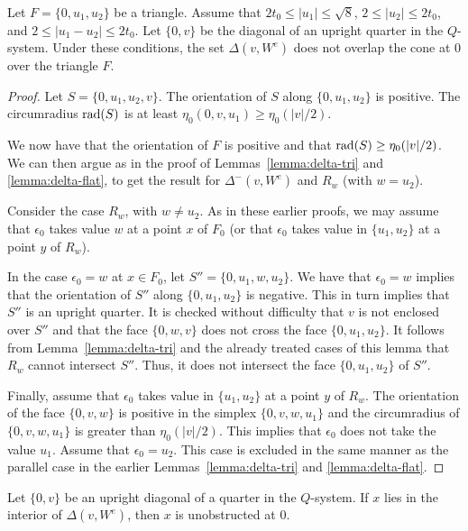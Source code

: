 \begin{lemma}\label{lemma:delta-upright}
Let $F=\{0,u_1,u_2\}$ be a triangle.  Assume that $2t_0\le|u_1|\le
\sqrt8$, $2\le|u_2|\le 2t_0$, and $2\le|u_1-u_2|\le2t_0$.  Let
$\{0,v\}$ be the diagonal of an upright quarter in the $Q$-system.
Under these conditions, the set $\Delta(v,W^e)$ does not overlap
the cone at $0$ over the triangle $F$.
\end{lemma}

\begin{proof}
Let $S=\{0,u_1,u_2,v\}$.  The orientation of $S$ along
$\{0,u_1,u_2\}$ is positive.  The circumradius $\operatorname{rad}(S)$ is at
least $\eta_0(0,v,u_1)\ge\eta_0(|v|/2)$.

We now have that the orientation of $F$ is positive and that
$\operatorname{rad}(S) \ge\eta_0(|v|/2)$.  We can then argue as in the proof of
Lemmas~\ref{lemma:delta-tri} and \ref{lemma:delta-flat}, to get
the result for $\Delta^-(v,W^e)$ and $R_{w}$ (with $w=u_2$).

Consider the case $R_w$, with $w\ne u_2$.  As in these earlier
proofs, we may assume  that $\epsilon_0$ takes value $w$ at a
point $x$ of $F_0$ (or that $\epsilon_0$ takes value in
$\{u_1,u_2\}$ at a point $y$ of $R_w$).

In the case $\epsilon_0=w$ at $x\in F_0$, let
$S''=\{0,u_1,w,u_2\}$. We have that $\epsilon_0=w$ implies that
the orientation of $S''$ along $\{0,u_1,u_2\}$ is negative.  This
in turn implies that $S''$ is an upright quarter.  It is checked
without difficulty that $v$ is not enclosed over $S''$ and that
the face $\{0,w,v\}$ does not cross the face $\{0,u_1,u_2\}$.  It
follows from Lemma~\ref{lemma:delta-tri} and the already treated
cases of this lemma that $R_w$ cannot intersect $S''$.  Thus, it
does not intersect the face $\{0,u_1,u_2\}$ of $S''$.

Finally, assume that $\epsilon_0$ takes value in $\{u_1,u_2\}$ at
a point $y$ of $R_w$.  The orientation of the face $\{0,v,w\}$ is
positive in the simplex $\{0,v,w,u_1\}$ and the circumradius of
$\{0,v,w,u_1\}$ is greater than $\eta_0(|v|/2)$.  This implies
that $\epsilon_0$ does not take the value $u_1$.  Assume that
$\epsilon_0=u_2$.  This case is excluded in the same manner as the
parallel case in the earlier Lemmas~\ref{lemma:delta-tri} and
\ref{lemma:delta-flat}.
\end{proof}

\begin{lemma}
Let $\{0,v\}$ be an upright diagonal of a quarter in the
$Q$-system.   If $x$ lies in the interior of $\Delta(v,W^e)$,
then $x$ is unobstructed at $0$.
\end{lemma}

